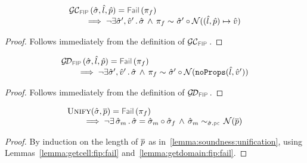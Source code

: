  \begin{lemma}\label{lemma:getcell:fip:fail}
$$
\begin{array}{l}
\GetCellV{\sstate, \sloc, \sexprp} = \fail{\pc_f} \\ \quad \quad
    \implies 
        \neg \exists \sstate', \sexprv' \, . \, \stateequivrel{\sstate \, \wedge \, \pc_f}{\sstate' \statecompose \normaliser((\sloc, \sexprp) \pointsto \sexprv)}{}
\end{array}
$$
\end{lemma}
\begin{proof}
Follows immediately from the definition of $\GetCellVFun$. 
\end{proof}

\begin{lemma}\label{lemma:getdomain:fip:fail}
$$
\begin{array}{l}
\GetDomainV{\sstate, \sloc, \sexprp} = \fail{\pc_f} \\ \quad \quad 
    \implies 
         \neg \exists \sstate', \sexprv' \, . \, \stateequivrel{\sstate \, \wedge \, \pc_f}{\sstate' \statecompose \normaliser(\emptyfields{\sloc}{\sexprv'})}{}
\end{array}
$$
\end{lemma}
 \begin{proof}
Follows immediately from the definition of $\GetDomainVFun$. 
\end{proof}
 
 
 \begin{lemma}\label{lemma:soundness:unification:failure}
$$
\begin{array}{l}
\unificationfun(\sstate, \jvec{\spass}) = \fail{\pc_f} \\ \quad \quad
  \implies 
   \neg \exists \, \sstate_m \, . \, 
   \sstate = \sstate_m \statecompose \sstate_f 
   \, \wedge \, 
    \stateequivrel{\sstate_m}{\normaliser(\jvec{\spass})}{\sstate.\pcsel}
\end{array}
$$
\end{lemma}
  \begin{proof}
By induction on the length of $\overline{p}$ as in~\ref{lemma:soundness:unification}, using 
Lemmas~\ref{lemma:getcell:fip:fail} and~\ref{lemma:getdomain:fip:fail}. 
\end{proof}
 
